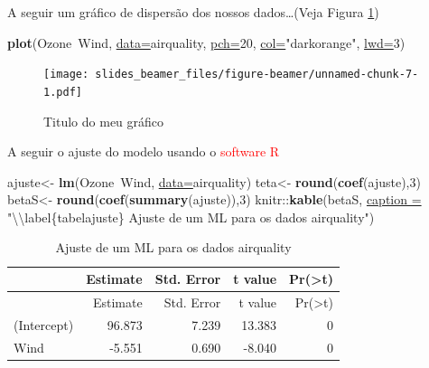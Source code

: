 \documentclass[10pt,ignorenonframetext,]{beamer}
\newenvironment{Shaded}{\begin{snugshade}}{\end{snugshade}}
\newcommand{\CharTok}[1]{\textcolor[rgb]{0.02,0.61,0.04}{#1}}
\newcommand{\DataTypeTok}[1]{\textcolor[rgb]{0.74,0.68,0.62}{\underline{#1}}}
\newcommand{\DecValTok}[1]{\textcolor[rgb]{0.27,0.67,0.26}{#1}}
\newcommand{\KeywordTok}[1]{\textcolor[rgb]{0.26,0.66,0.93}{\textbf{#1}}}
\newcommand{\NormalTok}[1]{\textcolor[rgb]{0.74,0.68,0.62}{#1}}
\newcommand{\OperatorTok}[1]{\textcolor[rgb]{0.74,0.68,0.62}{#1}}
\newcommand{\StringTok}[1]{\textcolor[rgb]{0.02,0.61,0.04}{#1}}
\begin{document}
\begin{frame}[fragile]{A seguir um gráfico de dispersão dos nossos
dados\ldots{}(Veja Figura \ref{scatterplot})}
\protect\hypertarget{a-seguir-um-gruxe1fico-de-dispersuxe3o-dos-nossos-dadosveja-figura}{}

\begin{Shaded}
\begin{Highlighting}[]
\KeywordTok{plot}\NormalTok{(Ozone}\OperatorTok{~}\NormalTok{Wind, }\DataTypeTok{data=}\NormalTok{airquality, }\DataTypeTok{pch=}\DecValTok{20}\NormalTok{, }
     \DataTypeTok{col=}\StringTok{"darkorange"}\NormalTok{, }\DataTypeTok{lwd=}\DecValTok{3}\NormalTok{)}
\end{Highlighting}
\end{Shaded}

\begin{figure}
\centering
\texttt{[image: slides\_beamer\_files/figure-beamer/unnamed-chunk-7-1.pdf]}
\caption{\label{scatterplot}Titulo do meu gráfico}
\end{figure}

\end{frame}

\begin{frame}[fragile]{A seguir o ajuste do modelo usando o
\textcolor{red}{software R}}
\protect\hypertarget{a-seguir-o-ajuste-do-modelo-usando-o}{}

\begin{Shaded}
\begin{Highlighting}[]
\NormalTok{ajuste<-}\StringTok{ }\KeywordTok{lm}\NormalTok{(Ozone}\OperatorTok{~}\NormalTok{Wind, }\DataTypeTok{data=}\NormalTok{airquality)}
\NormalTok{teta<-}\StringTok{ }\KeywordTok{round}\NormalTok{(}\KeywordTok{coef}\NormalTok{(ajuste),}\DecValTok{3}\NormalTok{)}
\NormalTok{betaS<-}\StringTok{ }\KeywordTok{round}\NormalTok{(}\KeywordTok{coef}\NormalTok{(}\KeywordTok{summary}\NormalTok{(ajuste)),}\DecValTok{3}\NormalTok{)}
\NormalTok{knitr}\OperatorTok{::}\KeywordTok{kable}\NormalTok{(betaS, }\DataTypeTok{caption =} \StringTok{"}\CharTok{\textbackslash{}\textbackslash{}}\StringTok{label\{tabelajuste\}}
\StringTok{             Ajuste de um ML para os dados airquality"}\NormalTok{)}
\end{Highlighting}
\end{Shaded}

\begin{longtable}[]{@{}lrrrr@{}}
\caption{\label{tabelajuste} Ajuste de um ML para os dados
airquality}\tabularnewline
\toprule
& Estimate & Std. Error & t value &
Pr(\textgreater{}\textbar{}t\textbar{})\tabularnewline
\midrule
\endfirsthead
\toprule
& Estimate & Std. Error & t value &
Pr(\textgreater{}\textbar{}t\textbar{})\tabularnewline
\midrule
\endhead
(Intercept) & 96.873 & 7.239 & 13.383 & 0\tabularnewline
Wind & -5.551 & 0.690 & -8.040 & 0\tabularnewline
\bottomrule
\end{longtable}

\end{frame}
\end{document}
